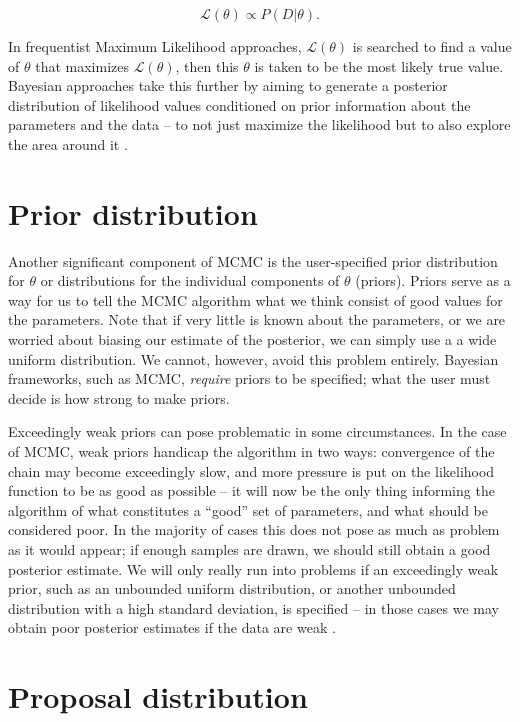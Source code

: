     \begin{equation}
    	\mathcal{L}(\theta) \propto P(D|\theta).
    \end{equation}

    In frequentist Maximum Likelihood approaches, $\mathcal{L}(\theta)$ is searched to find a value of $\theta$ that maximizes $\mathcal{L}(\theta)$, then this $\theta$ is taken to be the most likely true value. Bayesian approaches take this further by aiming to generate a posterior distribution of likelihood values conditioned on prior information about the parameters and the data -- to not just maximize the likelihood but to also explore the area around it \cite{Andrieu2003}.


\section{Prior distribution}

    Another significant component of MCMC is the user-specified prior distribution for $\theta$ or distributions for the individual components of $\theta$ (priors). Priors serve as a way for us to tell the MCMC algorithm what we think consist of good values for the parameters. Note that if very little is known about the parameters, or we are worried about biasing our estimate of the posterior, we can simply use a a wide uniform distribution. We cannot, however, avoid this problem entirely. Bayesian frameworks, such as MCMC, \textit{require} priors to be specified; what the user must decide is how strong to make priors.

   	Exceedingly weak priors can pose problematic in some circumstances. In the case of MCMC, weak priors handicap the algorithm in two ways: convergence of the chain may become exceedingly slow, and more pressure is put on the likelihood function to be as good as possible -- it will now be the only thing informing the algorithm of what constitutes a ``good'' set of parameters, and what should be considered poor. In the majority of cases this does not pose as much as problem as it would appear; if enough samples are drawn, we should still obtain a good posterior estimate. We will only really run into problems if an exceedingly weak prior, such as an unbounded uniform distribution, or another unbounded distribution with a high standard deviation, is specified -- in those cases we may obtain poor posterior estimates if the data are weak \cite{Andrieu2003}.

\section{Proposal distribution}

